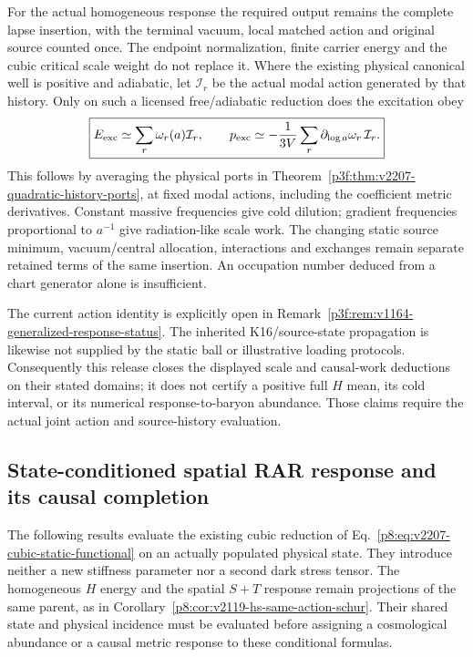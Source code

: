 \documentclass[12pt,a4paper]{article}
\begin{document}
For the actual homogeneous response the required output remains the
complete lapse insertion, with the terminal vacuum, local matched action
and original source counted once. The endpoint normalization, finite
carrier energy and the cubic critical scale weight do not replace it.
Where the existing physical canonical well is positive and adiabatic,
let $\mathcal I_r$ be the actual modal action generated by that history.
Only on such a licensed free/adiabatic reduction does the excitation obey
\begin{equation}
\label{p8:eq:v2207-adiabatic-energy-pressure}
 \boxed{E_{\rm exc}\simeq\sum_r\omega_r(a)\mathcal I_r,\qquad
 p_{\rm exc}\simeq-\frac1{3V}
                   \sum_r\partial_{\log a}\omega_r\,\mathcal I_r.}
\end{equation}
This follows by averaging the physical ports in
Theorem~\ref{p3f:thm:v2207-quadratic-history-ports}, at fixed modal
actions, including the coefficient metric derivatives. Constant massive
frequencies give cold dilution; gradient frequencies proportional to
$a^{-1}$ give radiation-like scale work. The changing static source
minimum, vacuum/central allocation, interactions and exchanges remain
separate retained terms of the same insertion. An occupation number
deduced from a chart generator alone is insufficient.

The current action identity is explicitly open in
Remark~\ref{p3f:rem:v1164-generalized-response-status}. The inherited
K16/source-state propagation is likewise not supplied by the static ball
or illustrative loading protocols. Consequently this release closes
the displayed scale and causal-work deductions on their stated domains;
it does not certify a positive full $H$ mean, its cold interval, or its
numerical response-to-baryon abundance. Those claims require the actual
joint action and source-history evaluation.


\subsection{State-conditioned spatial RAR response and its causal completion}
\label{p8:sec:v2209-state-conditioned-rar}

The following results evaluate the existing cubic reduction of
Eq.~\eqref{p8:eq:v2207-cubic-static-functional} on an actually populated
physical state. They introduce neither a new stiffness parameter nor a
second dark stress tensor. The homogeneous $H$ energy and the spatial
$S+T$ response remain projections of the same parent, as in
Corollary~\ref{p8:cor:v2119-hs-same-action-schur}. Their shared state and
physical incidence must be evaluated before assigning a cosmological
abundance or a causal metric response to these conditional formulas.
\end{document}
